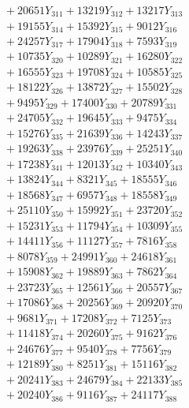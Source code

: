 \documentclass[a4paper,10pt]{article}
\begin{document}
{\begin{align}
&\;  + 20651 Y_{311} + 13219 Y_{312} + 13217 Y_{313} \\[0.3ex]
&\;  + 19155 Y_{314} + 15392 Y_{315} + 9012 Y_{316} \\[0.3ex]
&\;  + 24257 Y_{317} + 17904 Y_{318} + 7593 Y_{319} \\[0.3ex]
&\;  + 10735 Y_{320} + 10289 Y_{321} + 16280 Y_{322} \\[0.3ex]
&\;  + 16555 Y_{323} + 19708 Y_{324} + 10585 Y_{325} \\[0.3ex]
&\;  + 18122 Y_{326} + 13872 Y_{327} + 15502 Y_{328} \\[0.5ex]\allowbreak
&\;  + 9495 Y_{329} + 17400 Y_{330} + 20789 Y_{331} \\[0.3ex]
&\;  + 24705 Y_{332} + 19645 Y_{333} + 9475 Y_{334} \\[0.3ex]
&\;  + 15276 Y_{335} + 21639 Y_{336} + 14243 Y_{337} \\[0.3ex]
&\;  + 19263 Y_{338} + 23976 Y_{339} + 25251 Y_{340} \\[0.3ex]
&\;  + 17238 Y_{341} + 12013 Y_{342} + 10340 Y_{343} \\[0.3ex]
&\;  + 13824 Y_{344} + 8321 Y_{345} + 18555 Y_{346} \\[0.3ex]
&\;  + 18568 Y_{347} + 6957 Y_{348} + 18558 Y_{349} \\[0.3ex]
&\;  + 25110 Y_{350} + 15992 Y_{351} + 23720 Y_{352} \\[0.3ex]
&\;  + 15231 Y_{353} + 11794 Y_{354} + 10309 Y_{355} \\[0.3ex]
&\;  + 14411 Y_{356} + 11127 Y_{357} + 7816 Y_{358} \\[0.5ex]\allowbreak
&\;  + 8078 Y_{359} + 24991 Y_{360} + 24618 Y_{361} \\[0.3ex]
&\;  + 15908 Y_{362} + 19889 Y_{363} + 7862 Y_{364} \\[0.3ex]
&\;  + 23723 Y_{365} + 12561 Y_{366} + 20557 Y_{367} \\[0.3ex]
&\;  + 17086 Y_{368} + 20256 Y_{369} + 20920 Y_{370} \\[0.3ex]
&\;  + 9681 Y_{371} + 17208 Y_{372} + 7125 Y_{373} \\[0.3ex]
&\;  + 11418 Y_{374} + 20260 Y_{375} + 9162 Y_{376} \\[0.3ex]
&\;  + 24676 Y_{377} + 9540 Y_{378} + 7756 Y_{379} \\[0.3ex]
&\;  + 12189 Y_{380} + 8251 Y_{381} + 15116 Y_{382} \\[0.3ex]
&\;  + 20241 Y_{383} + 24679 Y_{384} + 22133 Y_{385} \\[0.3ex]
&\;  + 20240 Y_{386} + 9116 Y_{387} + 24117 Y_{388} \\[0.5ex]\allowbreak

\end{align}}
\end{document}
